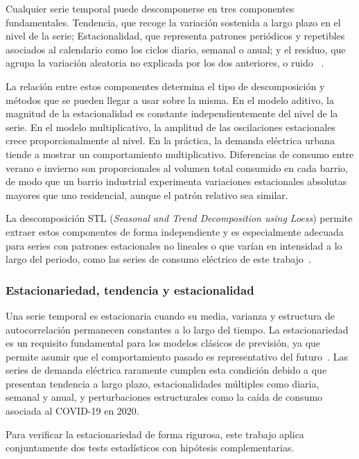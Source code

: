\documentclass[12pt, a4paper]{article}
\begin{document}
Cualquier serie temporal puede descomponerse en tres componentes fundamentales. Tendencia, que recoge la variación sostenida a largo plazo en el nivel de la serie;  Estacionalidad, que representa patrones periódicos y repetibles asociados al calendario como los ciclos diario, semanal o anual; y el residuo, que agrupa la variación aleatoria no explicada por los dos anteriores, o ruido ~\cite{hyndman2021}.

La relación entre estos componentes determina el tipo de descomposición y métodos que se pueden llegar a usar sobre la misma. En el modelo aditivo, la magnitud de la estacionalidad es constante independientemente del nivel de la serie. En el modelo multiplicativo, la amplitud de las oscilaciones estacionales crece proporcionalmente al nivel. En la práctica, la demanda eléctrica urbana tiende a mostrar un comportamiento multiplicativo. Diferencias de consumo entre verano e invierno son proporcionales al volumen total consumido en cada barrio, de modo que un barrio industrial experimenta variaciones estacionales absolutas mayores que uno residencial, aunque el patrón relativo sea similar.

La descomposición STL (\textit{Seasonal and Trend Decomposition using Loess}) permite extraer estos componentes de forma independiente y es especialmente adecuada para series con patrones estacionales no lineales o que varían en intensidad a lo largo del periodo, como las series de consumo eléctrico de este trabajo~\cite{hyndman2021}.

\subsubsection{Estacionariedad, tendencia y estacionalidad}

Una serie temporal es estacionaria cuando su media, varianza y estructura de autocorrelación permanecen constantes a lo largo del tiempo. La estacionariedad es un requisito fundamental para los modelos clásicos de previsión, ya que permite asumir que el comportamiento pasado es representativo del futuro~\cite{hyndman2021}. Las series de demanda eléctrica raramente cumplen esta condición debido a que presentan tendencia a largo plazo, estacionalidades múltiples como diaria, semanal y anual, y perturbaciones estructurales como la caída de consumo asociada al COVID-19 en 2020.

Para verificar la estacionariedad de forma rigurosa, este trabajo aplica conjuntamente dos tests estadísticos con hipótesis complementarias.
\end{document}
